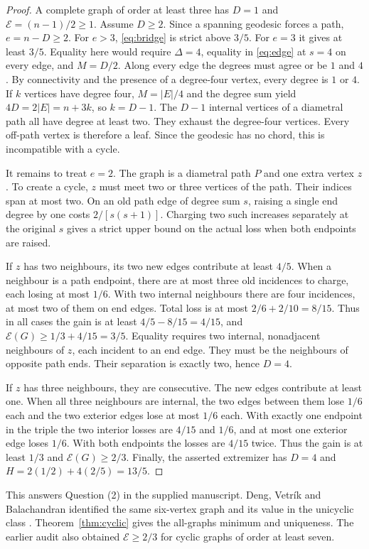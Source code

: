 \documentclass[11pt,a4paper]{article}
\newcommand{\gap}{\mathcal{E}}
\begin{document}
\begin{proof}
A complete graph of order at least three has $D=1$ and $\gap=(n-1)/2\ge1$. Assume $D\ge2$. Since a spanning geodesic forces a path, $e=n-D\ge2$. For $e>3$, \eqref{eq:bridge} is strict above $3/5$. For $e=3$ it gives at least $3/5$. Equality here would require $\Delta=4$, equality in \eqref{eq:edge} at $s=4$ on every edge, and $M=D/2$. Along every edge the degrees must agree or be $1$ and $4$. By connectivity and the presence of a degree-four vertex, every degree is $1$ or $4$. If $k$ vertices have degree four, $M=|E|/4$ and the degree sum yield $4D=2|E|=n+3k$, so $k=D-1$. The $D-1$ internal vertices of a diametral path all have degree at least two. They exhaust the degree-four vertices. Every off-path vertex is therefore a leaf. Since the geodesic has no chord, this is incompatible with a cycle.

It remains to treat $e=2$. The graph is a diametral path $P$ and one extra vertex $z$. To create a cycle, $z$ must meet two or three vertices of the path. Their indices span at most two. On an old path edge of degree sum $s$, raising a single end degree by one costs $2/[s(s+1)]$. Charging two such increases separately at the original $s$ gives a strict upper bound on the actual loss when both endpoints are raised.

If $z$ has two neighbours, its two new edges contribute at least $4/5$. When a neighbour is a path endpoint, there are at most three old incidences to charge, each losing at most $1/6$. With two internal neighbours there are four incidences, at most two of them on end edges. Total loss is at most $2/6+2/10=8/15$. Thus in all cases the gain is at least $4/5-8/15=4/15$, and $\gap(G)\ge1/3+4/15=3/5$. Equality requires two internal, nonadjacent neighbours of $z$, each incident to an end edge. They must be the neighbours of opposite path ends. Their separation is exactly two, hence $D=4$.

If $z$ has three neighbours, they are consecutive. The new edges contribute at least one. When all three neighbours are internal, the two edges between them lose $1/6$ each and the two exterior edges lose at most $1/6$ each. With exactly one endpoint in the triple the two interior losses are $4/15$ and $1/6$, and at most one exterior edge loses $1/6$. With both endpoints the losses are $4/15$ twice. Thus the gain is at least $1/3$ and $\gap(G)\ge2/3$. Finally, the asserted extremizer has $D=4$ and $H=2(1/2)+4(2/5)=13/5$.
\end{proof}
This answers Question (2) in the supplied manuscript. Deng, Vetr\'ik and Balachandran identified the same six-vertex graph and its value in the unicyclic class \cite[Thm.~2.2]{dvb}. Theorem~\ref{thm:cyclic} gives the all-graphs minimum and uniqueness. The earlier audit \cite{previous} also obtained $\gap\ge2/3$ for cyclic graphs of order at least seven.
\end{document}
